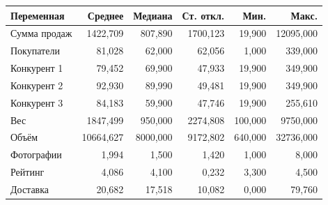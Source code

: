 \begin{tabular}{lrrrrr}
\toprule
Переменная & Среднее & Медиана & Ст. откл. & Мин. & Макс. \\
\midrule
Сумма продаж & 1422,709 & 807,890 & 1700,123 & 19,900 & 12095,000 \\
Покупатели & 81,028 & 62,000 & 62,056 & 1,000 & 339,000 \\
Конкурент 1 & 79,452 & 69,900 & 47,933 & 19,900 & 349,900 \\
Конкурент 2 & 92,930 & 89,990 & 49,481 & 19,900 & 349,900 \\
Конкурент 3 & 84,183 & 59,900 & 47,746 & 19,900 & 255,610 \\
Вес & 1847,499 & 950,000 & 2274,808 & 100,000 & 9750,000 \\
Объём & 10664,627 & 8000,000 & 9172,802 & 640,000 & 32736,000 \\
Фотографии & 1,994 & 1,500 & 1,420 & 1,000 & 8,000 \\
Рейтинг & 4,086 & 4,100 & 0,232 & 3,300 & 4,500 \\
Доставка & 20,682 & 17,518 & 10,082 & 0,000 & 79,760 \\
\bottomrule
\end{tabular}
